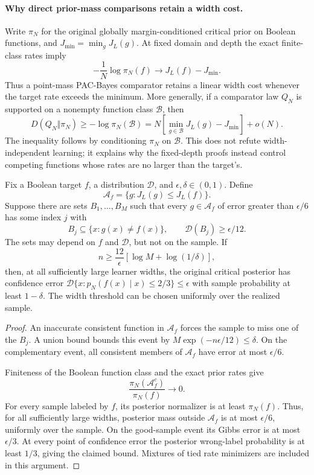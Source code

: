 \paragraph{Why direct prior-mass comparisons retain a width cost.}
Write $\pi_N$ for the original globally margin-conditioned critical
prior on Boolean functions, and $J_{\min}=\min_gJ_L(g)$. At fixed
domain and depth the exact finite-class rates imply
\[
 -\frac1N\log\pi_N(f)\longrightarrow J_L(f)-J_{\min}.
\]
Thus a point-mass PAC-Bayes comparator retains a linear width cost
whenever the target rate exceeds the minimum. More generally, if a
comparator law $Q_N$ is supported on a nonempty function class
$\mathcal B$, then
\[
 D(Q_N\Vert\pi_N)\ge-\log\pi_N(\mathcal B)
 =N\left[\min_{g\in\mathcal B}J_L(g)-J_{\min}\right]+o(N).
\]
The inequality follows by conditioning $\pi_N$ on $\mathcal B$.
This does not refute width-independent learning; it explains why the
fixed-depth proofs instead control competing functions whose rates
are no larger than the target's.

\begin{proposition}
\label{prop:critical-error-witnesses}
Fix a Boolean target $f$, a distribution $\mathcal D$, and
$\epsilon,\delta\in(0,1)$. Define
\[
 \mathcal A_f=\{g:J_L(g)\le J_L(f)\}.
\]
Suppose there are sets $B_1,\ldots,B_M$ such that every
$g\in\mathcal A_f$ of error greater than $\epsilon/6$ has some
index $j$ with
\[
 B_j\subseteq\{x:g(x)\ne f(x)\},\qquad
 \mathcal D(B_j)\ge\epsilon/12.
\]
The sets may depend on $f$ and $\mathcal D$, but not on the sample.
If
\[
 n\ge\frac{12}{\epsilon}
       \left[\log M+\log(1/\delta)\right],
\]
then, at all sufficiently large learner widths, the original critical
posterior has confidence error
$\mathcal D\{x:p_N(f(x)\mid x)\le2/3\}\le\epsilon$
with sample probability at least $1-\delta$.
The width threshold can be chosen uniformly over the realized sample.
\end{proposition}

\begin{proof}
An inaccurate consistent function in $\mathcal A_f$ forces the sample
to miss one of the $B_j$. A union bound bounds this event by
$M\exp(-n\epsilon/12)\le\delta$. On the complementary event,
all consistent members of $\mathcal A_f$ have error at most
$\epsilon/6$.

Finiteness of the Boolean function class and the exact prior rates give
\[
 \frac{\pi_N(\mathcal A_f^c)}{\pi_N(f)}\longrightarrow0.
\]
For every sample labeled by $f$, its posterior normalizer is at least
$\pi_N(f)$. Thus, for all sufficiently large widths, posterior mass
outside $\mathcal A_f$ is at most $\epsilon/6$, uniformly over
the sample. On the good-sample event its Gibbs error is at most
$\epsilon/3$. At every point of confidence error the posterior
wrong-label probability is at least $1/3$, giving the claimed bound.
Mixtures of tied rate minimizers are included in this argument.
\end{proof}

